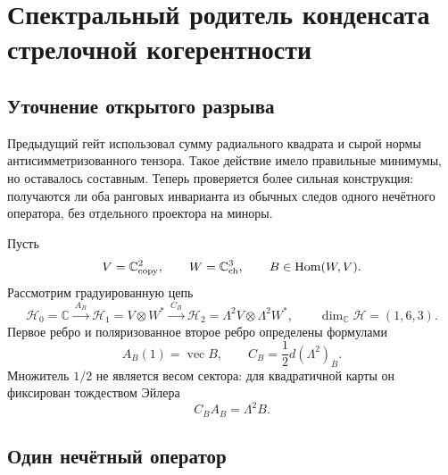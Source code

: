 \chapter{Спектральный родитель конденсата стрелочной когерентности}
\label{ch:v7-edge-coherence-spectral-parent-gate}

\section{Уточнение открытого разрыва}

Предыдущий гейт использовал сумму радиального квадрата и сырой нормы
антисимметризованного тензора. Такое действие имело правильные минимумы, но
оставалось составным. Теперь проверяется более сильная конструкция:
получаются ли оба ранговых инварианта из обычных следов одного нечётного
оператора, без отдельного проектора на миноры.

Пусть
\begin{equation}
 V=\mathbb C_{\rm copy}^2,\qquad
 W=\mathbb C_{\rm ch}^3,\qquad
 B\in\operatorname{Hom}(W,V).
 \label{eq:v7-coherence-parent-spaces}
\end{equation}
Рассмотрим градуированную цепь
\begin{equation}
 \mathcal H_0=\mathbb C
 \xrightarrow{\ A_B\ }
 \mathcal H_1=V\otimes W^*
 \xrightarrow{\ C_B\ }
 \mathcal H_2=\Lambda^2V\otimes\Lambda^2W^*,
 \qquad
 \dim_{\mathbb C}\mathcal H=(1,6,3).
 \label{eq:v7-coherence-parent-chain}
\end{equation}
Первое ребро и поляризованное второе ребро определены формулами
\begin{equation}
 A_B(1)=\operatorname{vec}B,
 \qquad
 C_B=\frac12d(\Lambda^2)_B.
 \label{eq:v7-coherence-parent-edges}
\end{equation}
Множитель $1/2$ не является весом сектора: для квадратичной карты он
фиксирован тождеством Эйлера
\begin{equation}
 C_BA_B=\Lambda^2B.
 \label{eq:v7-coherence-parent-polarization}
\end{equation}

\section{Один нечётный оператор}

